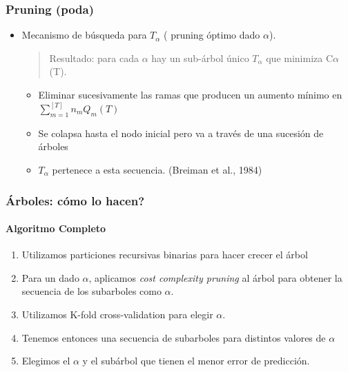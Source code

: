 \documentclass[
  shownotes,
  xcolor={svgnames},
  hyperref={colorlinks,citecolor=DarkBlue,linkcolor=andesred,urlcolor=DarkBlue}
  , aspectratio=169]{beamer}
\begin{document}
\begin{frame}[fragile]
\frametitle{Pruning (poda)}

\begin{itemize}
  \item Mecanismo de búsqueda para $T_\alpha$ ( pruning óptimo dado  $\alpha$).

\medskip
    \begin{quote}
    \centering
    Resultado: para cada  $\alpha$ hay un sub-árbol único  $T_\alpha$ que minimiza  C$\alpha$ (T).
    \end{quote}

\begin{itemize}

\medskip
\item Eliminar sucesivamente las ramas que producen un aumento mínimo en  $\sum_{m=1}^{[T]} n_m  Q_m (T)$
\medskip
\item Se colapsa hasta el nodo inicial pero va a través de una sucesión de árboles
\medskip
\item $T_\alpha$ pertenece a esta secuencia.  (Breiman et al., 1984)
\end{itemize}





\end{itemize}


\end{frame}
\begin{frame}[fragile]
\frametitle{Árboles: cómo lo hacen?}
\framesubtitle{Algoritmo Completo}


\begin{enumerate}
  \item Utilizamos particiones recursivas binarias para hacer crecer el árbol
  \medskip
  \item Para un dado $\alpha$, aplicamos {\it cost complexity pruning} al árbol para obtener la secuencia de los subarboles como  $\alpha$.
  \medskip
  \item  Utilizamos K-fold cross-validation para elegir $\alpha$. 
  \medskip
  
  
\item Tenemos entonces una secuencia de subarboles para distintos valores de $\alpha$ 
\medskip
\item Elegimos el $\alpha$ y el subárbol que tienen el menor error de predicción.
\end{enumerate}


\end{frame}
\end{document}
